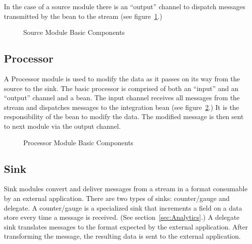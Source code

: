 \par

In the case of a source module there is an ``output'' channel to dispatch messages 
transmitted by the bean to the stream (see figure~\ref{fig:sourcembc}.)

\par

\begin{figure}[ht]
\centering
{}
\caption{Source Module Basic Components}
\label{fig:sourcembc}
\end{figure}

\par

\subsection{Processor}
A Processor module is used to modify the data as it passes on its way from the source to
the sink.  The basic processor is comprised of both an ``input'' and an ``output'' channel
and a bean.
The input channel receives all messages from the stream and dispatches
messages to the integration bean (see figure~\ref{fig:processormbc}.) It is the responsibility of
the bean to modify the data. The modified message is then sent to next module 
via the output channel.  

\par

\begin{figure}
\centering
{}
\caption{Processor Module Basic Components}
\label{fig:processormbc}
\end{figure}

\par

\subsection{Sink}
Sink modules convert and deliver messages from a stream in a format consumable by 
an external application.  There are two types of sinks: counter/gauge and delegate.
A counter/gauge is a specialized sink that increments a field on a data store every time a
message is received. (See section~\ref{sec:Analytics}.) A delegate
sink translates messages to the format expected by the external application.
After transforming the message, the resulting data is sent to the external application.

